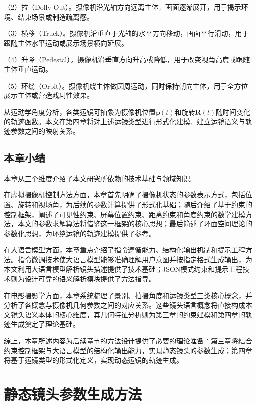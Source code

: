 （2）拉（Dolly Out）。摄像机沿光轴方向远离主体，画面逐渐展开，用于揭示环境、结束场景或制造疏离感。

（3）横移（Truck）。摄像机沿垂直于光轴的水平方向移动，画面平行滑动，用于跟随主体水平运动或展示场景横向延展。

（4）升降（Pedestal）。摄像机沿垂直方向升高或降低，用于改变视角高度或跟随主体垂直运动。

（5）环绕（Orbit）。摄像机绕主体做圆周运动，同时保持朝向主体，用于全方位展示主体或营造戏剧性效果。

从运动学角度分析，各类运镜可抽象为摄像机位置$\mathbf{p}(t)$和旋转$\mathbf{R}(t)$随时间变化的轨迹函数。本文在第四章将对上述运镜类型进行形式化建模，建立运镜语义与轨迹参数之间的映射关系。

\section{本章小结}

本章从三个维度介绍了本文研究所依赖的技术基础与领域知识。

在虚拟摄像机控制方法方面，本章首先明确了摄像机状态的参数表示方式，包括位置、旋转和视场角，为后续的参数计算提供了形式化基础；随后介绍了基于约束的控制框架，阐述了可见性约束、屏幕位置约束、距离约束和角度约束的数学建模方法，本文的参数求解算法将借鉴这一框架的核心思想；最后简述了环面空间理论的参数化思想，为环绕运镜的轨迹建模提供了参考。

在大语言模型方面，本章重点介绍了指令遵循能力、结构化输出机制和提示工程方法。指令微调技术使大语言模型能够准确理解用户意图并按指定格式生成输出，为本文利用大语言模型解析镜头描述提供了技术基础；JSON模式约束和提示工程技术则为设计可靠的语义解析模块提供了方法指导。

在电影摄影学方面，本章系统梳理了景别、拍摄角度和运镜类型三类核心概念，并分析了各概念与摄像机几何参数之间的对应关系。这些镜头语言概念将直接构成本文镜头语义本体的核心维度，其几何特征分析则为第三章的约束建模和第四章的轨迹生成奠定了理论基础。

综上，本章所述内容为后续章节的方法设计提供了必要的理论准备：第三章将结合约束控制框架与大语言模型的结构化输出能力，实现静态镜头的参数生成；第四章将基于运镜类型的形式化定义，实现动态运镜的轨迹生成。


\chapter{静态镜头参数生成方法}

